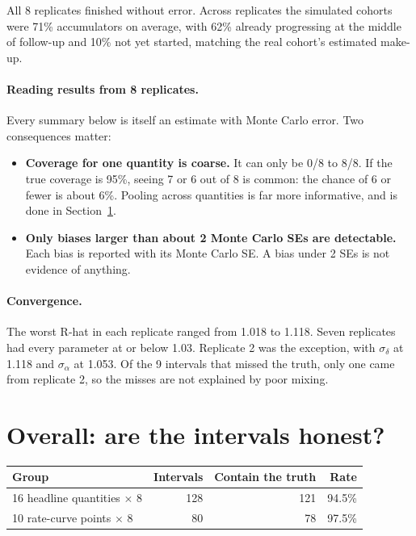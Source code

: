 \documentclass[11pt]{article}
\begin{document}
All 8 replicates finished without error. Across replicates the simulated cohorts were 71\% accumulators on average, with 62\% already progressing at the middle of follow-up and 10\% not yet started, matching the real cohort's estimated make-up.

\paragraph{Reading results from 8 replicates.} Every summary below is itself an estimate with Monte Carlo error. Two consequences matter:

\begin{itemize}
  \item \textbf{Coverage for one quantity is coarse.} It can only be 0/8 to 8/8. If the true coverage is 95\%, seeing 7 or 6 out of 8 is common: the chance of 6 or fewer is about 6\%. Pooling across quantities is far more informative, and is done in Section~\ref{sec:overall}.
  \item \textbf{Only biases larger than about 2 Monte Carlo SEs are detectable.} Each bias is reported with its Monte Carlo SE. A bias under 2 SEs is not evidence of anything.
\end{itemize}

\paragraph{Convergence.} The worst R-hat in each replicate ranged from 1.018 to 1.118. Seven replicates had every parameter at or below 1.03. Replicate 2 was the exception, with $\sigma_\delta$ at 1.118 and $\sigma_\alpha$ at 1.053. Of the 9 intervals that missed the truth, only one came from replicate 2, so the misses are not explained by poor mixing.

\section{Overall: are the intervals honest?}\label{sec:overall}

\begin{center}
\small
\begin{tabular}{@{}l r r r@{}}
\toprule
Group & Intervals & Contain the truth & Rate \\
\midrule
16 headline quantities $\times$ 8 & 128 & 121 & 94.5\% \\
10 rate-curve points $\times$ 8 & 80 & 78 & 97.5\% \\
\bottomrule
\end{tabular}
\end{center}
\end{document}
